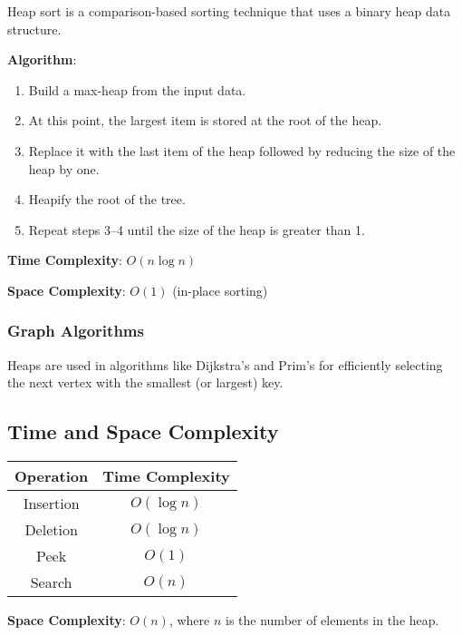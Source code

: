 Heap sort is a comparison-based sorting technique that uses a binary heap data structure.

\textbf{Algorithm}:
\begin{enumerate}
    \item Build a max-heap from the input data.
    \item At this point, the largest item is stored at the root of the heap.
    \item Replace it with the last item of the heap followed by reducing the size of the heap by one.
    \item Heapify the root of the tree.
    \item Repeat steps 3–4 until the size of the heap is greater than 1.
\end{enumerate}

\textbf{Time Complexity}: $O(n \log n)$

\textbf{Space Complexity}: $O(1)$ (in-place sorting)

\subsubsection{Graph Algorithms}

Heaps are used in algorithms like Dijkstra's and Prim's for efficiently selecting the next vertex with the smallest (or largest) key.

\subsection{Time and Space Complexity}

\begin{tabular}{|c|c|}
\hline
\textbf{Operation} & \textbf{Time Complexity} \\
\hline
Insertion & $O(\log n)$ \\
Deletion  & $O(\log n)$ \\
Peek      & $O(1)$ \\
Search    & $O(n)$ \\
\hline
\end{tabular}

\textbf{Space Complexity}: $O(n)$, where $n$ is the number of elements in the heap.
